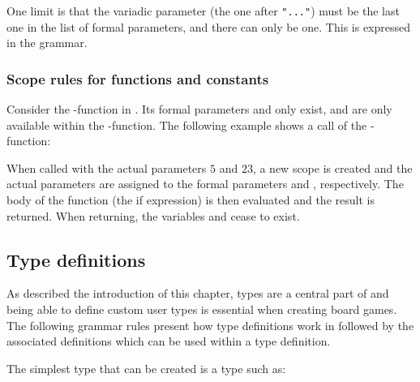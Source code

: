 
One limit is that the variadic parameter (the one after \texttt{"..."}) must be
the last one in the list of formal parameters, and there can only be one. This
is expressed in the grammar.

\subsubsection{Scope rules for functions and constants}

Consider the -function in . Its formal
parameters  and  only exist, and are only available
within the -function. The following example shows a call of the
-function:


When called with the actual parameters $5$ and $23$, a new scope is created and
the actual parameters are assigned to the formal parameters  and
, respectively. The body of the function (the if expression) is then
evaluated and the result is returned. When returning, the variables
 and  cease to exist. 

\subsection{Type definitions}
\label{sec:typedefinitions}

As described the introduction of this chapter, types are a central part of
\productname{} and being able to define custom user types is essential when
creating board games.
The following grammar rules present how type definitions work in
\productname{} followed by the associated definitions which can be used within
a type definition.

\begin{ebnf}
 
\end{ebnf}

The simplest type that can be created is a type such as:


